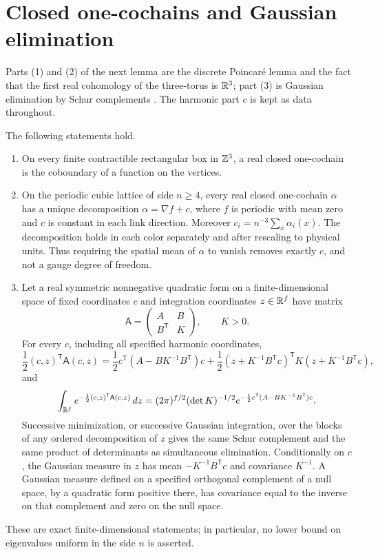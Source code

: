 \section{Closed one-cochains and Gaussian elimination}\label{ch02:sec:hodge}

Parts (1) and (2) of the next lemma are the discrete Poincaré lemma and the fact that the first real cohomology of the three-torus is $\mathbb R^3$; part (3) is Gaussian elimination by Schur complements \cite{Bhatia1997}. The harmonic part $c$ is kept as data throughout.

\begin{lemma}\label{ch02:lem:hodge-schur}
The following statements hold.
\begin{enumerate}
\item On every finite contractible rectangular box in $\mathbb Z^3$, a real closed one-cochain is the coboundary of a function on the vertices.
\item On the periodic cubic lattice of side $n\ge4$, every real closed one-cochain $\alpha$ has a unique decomposition $\alpha=\nabla f+c$, where $f$ is periodic with mean zero and $c$ is constant in each link direction. Moreover $c_i=n^{-3}\sum_x\alpha_i(x)$. The decomposition holds in each color separately and after rescaling to physical units. Thus requiring the spatial mean of $\alpha$ to vanish removes exactly $c$, and not a gauge degree of freedom.
\item Let a real symmetric nonnegative quadratic form on a finite-dimensional space of fixed coordinates $c$ and integration coordinates $z\in\mathbb R^f$ have matrix
\[
 \mathsf A=\begin{pmatrix}A&B\\B^{\mathsf T}&K\end{pmatrix},\qquad K>0.
\]
For every $c$, including all specified harmonic coordinates,
\[
 \frac12(c,z)^{\mathsf T}\mathsf A(c,z)
 =\frac12c^{\mathsf T}(A-BK^{-1}B^{\mathsf T})c
   +\frac12(z+K^{-1}B^{\mathsf T}c)^{\mathsf T}K(z+K^{-1}B^{\mathsf T}c),
\]
and
\[
 \int_{\mathbb R^f}e^{-\frac12(c,z)^{\mathsf T}\mathsf A(c,z)}\,dz
 =(2\pi)^{f/2}(\det K)^{-1/2}e^{-\frac12c^{\mathsf T}(A-BK^{-1}B^{\mathsf T})c}.
\]
Successive minimization, or successive Gaussian integration, over the blocks of any ordered decomposition of $z$ gives the same Schur complement and the same product of determinants as simultaneous elimination. Conditionally on $c$, the Gaussian measure in $z$ has mean $-K^{-1}B^{\mathsf T}c$ and covariance $K^{-1}$. A Gaussian measure defined on a specified orthogonal complement of a null space, by a quadratic form positive there, has covariance equal to the inverse on that complement and zero on the null space.
\end{enumerate}
These are exact finite-dimensional statements; in particular, no lower bound on eigenvalues uniform in the side $n$ is asserted.
\end{lemma}

